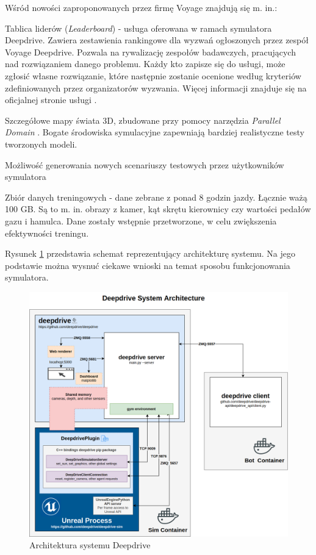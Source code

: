 Wśród nowości zaproponowanych przez firmę Voyage znajdują się m. in.:
\begin{itemize*}
\item Tablica liderów (\textit{Leaderboard}) - usługa oferowana w ramach symulatora Deepdrive. Zawiera zestawienia rankingowe dla wyzwań ogłoszonych przez zespół Voyage Deepdrive. Pozwala na rywalizację zespołów badawczych, pracujących nad rozwiązaniem danego problemu. Każdy kto zapisze się do usługi, może zgłosić własne rozwiązanie, które następnie zostanie ocenione według kryteriów zdefiniowanych przez organizatorów wyzwania. Więcej informacji znajduje się na oficjalnej stronie usługi \cite{deepdrive:leaderboard}.
\item Szczegółowe mapy świata 3D, zbudowane przy pomocy narzędzia \textit{Parallel Domain} \cite{parallelDomain}. Bogate środowiska symulacyjne zapewniają bardziej realistyczne testy tworzonych modeli.
\item Możliwość generowania nowych scenariuszy testowych przez użytkowników symulatora
\item Zbiór danych treningowych - dane zebrane z ponad 8 godzin jazdy. Łącznie ważą 100 GB. Są to m. in. obrazy z kamer, kąt skrętu kierownicy czy wartości pedałów gazu i hamulca. Dane zostały wstępnie przetworzone, w celu zwiększenia efektywności treningu.
\end{itemize*}

Rysunek \ref{DeepdriveArchitecture} przedstawia schemat reprezentujący architekturę systemu. Na jego podstawie można wysnuć ciekawe wnioski na temat sposobu funkcjonowania symulatora.

\begin{figure}[H]
\centering
\includegraphics[width=16cm]{resources/figures/deepdrive-architecture.png}
\caption{Architektura systemu Deepdrive}
\label{DeepdriveArchitecture}
\end{figure}

